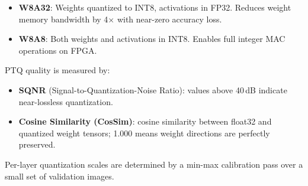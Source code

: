 \begin{itemize}
    \item \textbf{W8A32}: Weights quantized to INT8, activations in FP32. Reduces weight memory bandwidth by 4$\times$ with near-zero accuracy loss.
    \item \textbf{W8A8}: Both weights and activations in INT8. Enables full integer MAC operations on FPGA.
\end{itemize}

PTQ quality is measured by:
\begin{itemize}
    \item \textbf{SQNR} (Signal-to-Quantization-Noise Ratio): values above 40\,dB indicate near-lossless quantization.
    \item \textbf{Cosine Similarity (CosSim)}: cosine similarity between float32 and quantized weight tensors; 1.000 means weight directions are perfectly preserved.
\end{itemize}

Per-layer quantization scales are determined by a min-max calibration pass over a small set of validation images.
